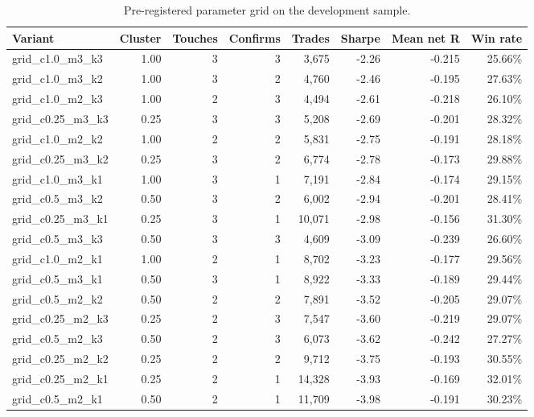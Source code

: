 \documentclass[11pt,a4paper]{article}
\begin{document}
\begin{table}[htbp]
\centering
\footnotesize
\setlength{\tabcolsep}{4pt}
\caption{Pre-registered parameter grid on the development sample.}
\label{tab:grid}
\begin{tabular}{lrrrrrrr}
\toprule
Variant & Cluster & Touches & Confirms & Trades & Sharpe & Mean net R & Win rate \\
\midrule
grid\_c1.0\_m3\_k3 & 1.00 & 3 & 3 & 3,675 & -2.26 & -0.215 & 25.66\% \\
grid\_c1.0\_m3\_k2 & 1.00 & 3 & 2 & 4,760 & -2.46 & -0.195 & 27.63\% \\
grid\_c1.0\_m2\_k3 & 1.00 & 2 & 3 & 4,494 & -2.61 & -0.218 & 26.10\% \\
grid\_c0.25\_m3\_k3 & 0.25 & 3 & 3 & 5,208 & -2.69 & -0.201 & 28.32\% \\
grid\_c1.0\_m2\_k2 & 1.00 & 2 & 2 & 5,831 & -2.75 & -0.191 & 28.18\% \\
grid\_c0.25\_m3\_k2 & 0.25 & 3 & 2 & 6,774 & -2.78 & -0.173 & 29.88\% \\
grid\_c1.0\_m3\_k1 & 1.00 & 3 & 1 & 7,191 & -2.84 & -0.174 & 29.15\% \\
grid\_c0.5\_m3\_k2 & 0.50 & 3 & 2 & 6,002 & -2.94 & -0.201 & 28.41\% \\
grid\_c0.25\_m3\_k1 & 0.25 & 3 & 1 & 10,071 & -2.98 & -0.156 & 31.30\% \\
grid\_c0.5\_m3\_k3 & 0.50 & 3 & 3 & 4,609 & -3.09 & -0.239 & 26.60\% \\
grid\_c1.0\_m2\_k1 & 1.00 & 2 & 1 & 8,702 & -3.23 & -0.177 & 29.56\% \\
grid\_c0.5\_m3\_k1 & 0.50 & 3 & 1 & 8,922 & -3.33 & -0.189 & 29.44\% \\
grid\_c0.5\_m2\_k2 & 0.50 & 2 & 2 & 7,891 & -3.52 & -0.205 & 29.07\% \\
grid\_c0.25\_m2\_k3 & 0.25 & 2 & 3 & 7,547 & -3.60 & -0.219 & 29.07\% \\
grid\_c0.5\_m2\_k3 & 0.50 & 2 & 3 & 6,073 & -3.62 & -0.242 & 27.27\% \\
grid\_c0.25\_m2\_k2 & 0.25 & 2 & 2 & 9,712 & -3.75 & -0.193 & 30.55\% \\
grid\_c0.25\_m2\_k1 & 0.25 & 2 & 1 & 14,328 & -3.93 & -0.169 & 32.01\% \\
grid\_c0.5\_m2\_k1 & 0.50 & 2 & 1 & 11,709 & -3.98 & -0.191 & 30.23\% \\
\bottomrule
\end{tabular}
\end{table}
\end{document}
